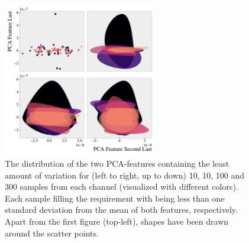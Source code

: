\begin{figure}
    \centering
    \includegraphics[width=0.6\textwidth]{Figures/MLResults/DataHandling/PCA/PCAPlotLast.pdf}
    \caption[The value distribution of the two last \acs{PCA}-features.]{The distribution of the two 
    \ac{PCA}-features containing the least amount of variation for (left to right, up to down) 10, 
    10, 100 and 300 samples from each channel (visualized with different colors). Each sample filling the 
    requirement with being less than one standard deviation from the mean of both features, respectively.
    Apart from the first figure (top-left), shapes have been drawn around the scatter points.}
    \label{fig:PCA2}
\end{figure}


